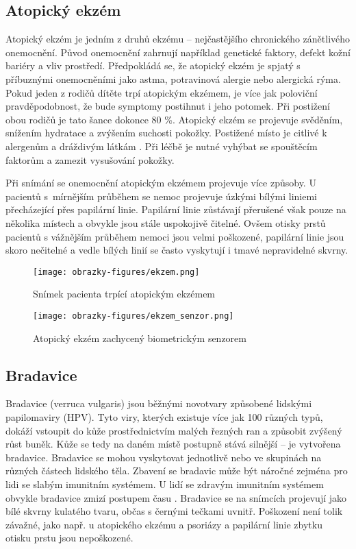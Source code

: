 \subsection{Atopický ekzém}
Atopický ekzém je jedním z druhů ekzému -- nejčastějšího chronického zánětlivého onemocnění. Původ onemocnění zahrnují například genetické faktory, defekt kožní bariéry a vliv prostředí. Předpokládá se, že atopický ekzém je spjatý s příbuznými onemocněními jako astma, potravinová alergie nebo alergická rýma. Pokud jeden z rodičů dítěte trpí atopickým ekzémem, je více jak poloviční pravděpodobnost, že bude symptomy postihnut i jeho potomek. Při postižení obou rodičů je tato šance dokonce 80 \%. Atopický ekzém se projevuje svěděním, snížením hydratace a zvýšením suchosti pokožky. Postižené místo je citlivé k alergenům a dráždivým látkám \cite{AtopicDermatitis}. Při léčbě je nutné vyhýbat se spouštěcím faktorům a zamezit vysušování pokožky.

Při snímání se onemocnění atopickým ekzémem projevuje více způsoby. U pacientů s~mírnějším průběhem se nemoc projevuje úzkými bílými liniemi přecházející přes papilární linie. Papilární linie zůstávají přerušené však pouze na několika místech a obvykle jsou stále uspokojivě čitelné. Ovšem otisky prstů pacientů s vážnějším průběhem nemoci jsou velmi poškozené, papilární linie jsou skoro nečitelné a vedle bílých linií se často vyskytují i tmavé nepravidelné skvrny.

\begin{figure}[!htbp]
  \begin{minipage}[b]{0.5\linewidth}
    \centering
    \texttt{[image: obrazky-figures/ekzem.png]}
    \caption{Snímek pacienta trpící atopickým ekzémem \cite{Barotova}}
  \end{minipage}
  \hspace{0.5cm}
  \begin{minipage}[b]{0.5\linewidth}
    \centering
    \texttt{[image: obrazky-figures/ekzem\_senzor.png]}
    \caption{Atopický ekzém zachycený biometrickým senzorem \cite{Barotova}}
  \end{minipage}
\end{figure}
\subsection{Bradavice}
Bradavice (verruca vulgaris) jsou běžnými novotvary způsobené lidskými papilomaviry (HPV). Tyto viry, kterých existuje více jak 100 různých typů, dokáží vstoupit do kůže prostřednictvím malých řezných ran a způsobit zvýšený růst buněk. Kůže se tedy na daném místě postupně stává silnější -- je vytvořena bradavice. Bradavice se mohou vyskytovat jednotlivě nebo ve skupinách na různých částech lidského těla. Zbavení se bradavic může být náročné zejména pro lidi se slabým imunitním systémem. U lidí se zdravým imunitním systémem obvykle bradavice zmizí postupem času \cite{WartsOverview}.  Bradavice se na snímcích projevují jako bílé skvrny kulatého tvaru, občas s černými tečkami uvnitř. Poškození není tolik závažné, jako např. u atopického ekzému a psoriázy a papilární linie zbytku otisku prstu jsou nepoškozené. 


